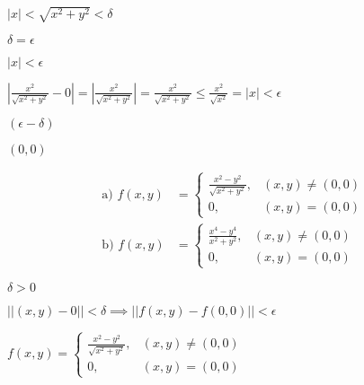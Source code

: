 \documentclass{article}
\def\lthtmlcheckvsize{\ifdim\ht\sizebox<\vsize 
  \ifdim\wd\sizebox<\hsize\expandafter\hfill\fi \expandafter\vfill
  \else\expandafter\vss\fi}%
\begin{document}
{\newpage\clearpage
{}%
$ |x|<\sqrt{x^2+y^2}<\delta$%
\lthtmlindisplaymathZ
\lthtmlcheckvsize\clearpage}

{\newpage\clearpage
{}%
$ \delta=\epsilon$%
\lthtmlindisplaymathZ
\lthtmlcheckvsize\clearpage}

{\newpage\clearpage
{}%
$ |x|<\epsilon$%
\lthtmlindisplaymathZ
\lthtmlcheckvsize\clearpage}

{\newpage\clearpage
{}%
$ |\frac{x^2}{\sqrt{x^2+y^2}}-0|=|\frac{x^2}{\sqrt{x^2+y^2}}|=\frac{x^2}{\sqrt{x^2+y^2}}\leq\frac{x
   ^2}{\sqrt{x^2}}=|x|<\epsilon$%
\lthtmlindisplaymathZ
\lthtmlcheckvsize\clearpage}

{\newpage\clearpage
{}%
$ (\epsilon-\delta)$%
\lthtmlindisplaymathZ
\lthtmlcheckvsize\clearpage}

{\newpage\clearpage
{}%
$ (0,0)$%
\lthtmlindisplaymathZ
\lthtmlcheckvsize\clearpage}

{\newpage\clearpage
{}%
\begin{displaymath}\begin{split}
\text{a) }  f(x,y) &= \begin{cases}
\frac{x^2-y^2}{\sqrt{x^2+y^2}}, & (x,y) \neq (0,0) \\
0, & (x,y) = (0,0)
\end{cases} \\
\text{b) }  f(x,y) &= \begin{cases}
\frac{x^4-y^4}{x^2+y^2}, & (x,y) \neq (0,0) \\
0, & (x,y) = (0,0)
\end{cases}
\end{split}\end{displaymath}%
\lthtmldisplayZ
\lthtmlcheckvsize\clearpage}

{\newpage\clearpage
{}%
$ \delta >0$%
\lthtmlindisplaymathZ
\lthtmlcheckvsize\clearpage}

{\newpage\clearpage
{}%
$ \lvert \lvert (x,y)-0 \rvert \rvert < \delta \implies \lvert \lvert f(x,y) - f(0,0) \rvert \rvert < \epsilon$%
\lthtmlindisplaymathZ
\lthtmlcheckvsize\clearpage}

{\newpage\clearpage
{}%
$\displaystyle f(x,y) = \begin{cases}
\frac{x^2-y^2}{\sqrt{x^2+y^2}}, & (x,y) \neq (0,0) \\
0, & (x,y) = (0,0)
\end{cases}$%
\lthtmlindisplaymathZ
\lthtmlcheckvsize\clearpage}
\end{document}
